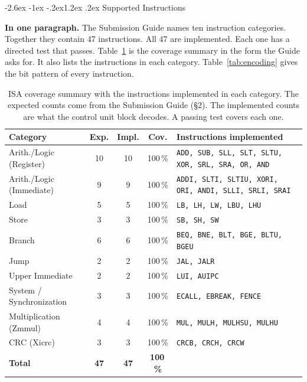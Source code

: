 \documentclass[11pt,a4paper]{article}
\makeatletter
\renewcommand\section{\@startsection{section}{1}{\z@}%
  {-2.6ex \@plus -1ex \@minus -.2ex}{1.2ex \@plus.2ex}%
  {\color{rvbl}\normalfont\large\bfseries}}
\newcommand{\hdr}[1]{\textbf{#1}}
\newcommand{\hrow}{\rowcolor{rvbltint}}
\makeatother
\begin{document}
\section{Supported Instructions}
\label{sec:isa}

\textbf{In one paragraph.} The Submission Guide names ten instruction categories. Together
they contain 47 instructions. All 47 are implemented. Each one has a directed test that
passes. Table~\ref{tab:coverage} is the coverage summary in the form the Guide asks for. It
also lists the instructions in each category. Table~\ref{tab:encoding} gives the bit pattern
of every instruction.

\begin{table}[htbp]
\centering\small
\caption{ISA coverage summary with the instructions implemented in each category.
The expected counts come from the Submission Guide (\S2). The implemented counts are what
the control unit block decodes. A passing test covers each one.}
\label{tab:coverage}
\begin{tabularx}{\linewidth}{>{\raggedright\arraybackslash}p{3.5cm}ccc>{\raggedright\arraybackslash}X}
\toprule
\hrow \hdr{Category} & \hdr{Exp.} & \hdr{Impl.} & \hdr{Cov.} & \hdr{Instructions implemented} \\
\midrule
Arith./Logic (Register)  & 10 & 10 & 100\,\% & \texttt{ADD, SUB, SLL, SLT, SLTU, XOR, SRL, SRA, OR, AND} \\
Arith./Logic (Immediate) &  9 &  9 & 100\,\% & \texttt{ADDI, SLTI, SLTIU, XORI, ORI, ANDI, SLLI, SRLI, SRAI} \\
Load                     &  5 &  5 & 100\,\% & \texttt{LB, LH, LW, LBU, LHU} \\
Store                    &  3 &  3 & 100\,\% & \texttt{SB, SH, SW} \\
Branch                   &  6 &  6 & 100\,\% & \texttt{BEQ, BNE, BLT, BGE, BLTU, BGEU} \\
Jump                     &  2 &  2 & 100\,\% & \texttt{JAL, JALR} \\
Upper Immediate          &  2 &  2 & 100\,\% & \texttt{LUI, AUIPC} \\
System / Synchronization &  3 &  3 & 100\,\% & \texttt{ECALL, EBREAK, FENCE} \\
Multiplication (Zmmul)   &  4 &  4 & 100\,\% & \texttt{MUL, MULH, MULHSU, MULHU} \\
CRC (Xicrc)              &  3 &  3 & 100\,\% & \texttt{CRCB, CRCH, CRCW} \\
\midrule
\hrow \textbf{Total} & \textbf{47} & \textbf{47} & \textbf{100\,\%} & \\
\bottomrule
\end{tabularx}
\end{table}
\end{document}
